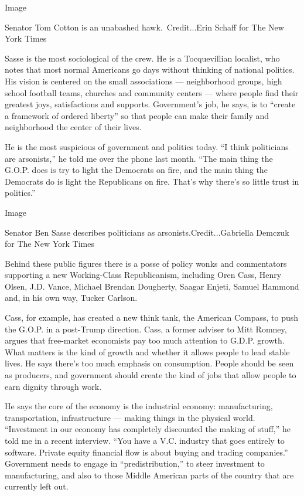 Image

Senator Tom Cotton is an unabashed hawk.~Credit...Erin Schaff for The
New York Times

Sasse is the most sociological of the crew. He is a Tocquevillian
localist, who notes that most normal Americans go days without thinking
of national politics. His vision is centered on the small associations
--- neighborhood groups, high school football teams, churches and
community centers --- where people find their greatest joys,
satisfactions and supports. Government's job, he says, is to ``create a
framework of ordered liberty'' so that people can make their family and
neighborhood the center of their lives.

He is the most suspicious of government and politics today. ``I think
politicians are arsonists,'' he told me over the phone last month. ``The
main thing the G.O.P. does is try to light the Democrats on fire, and
the main thing the Democrats do is light the Republicans on fire. That's
why there's so little trust in politics.''

Image

Senator Ben Sasse describes politicians as arsonists.Credit...Gabriella
Demczuk for The New York Times

Behind these public figures there is a posse of policy wonks and
commentators supporting a new Working-Class Republicanism, including
Oren Cass, Henry Olsen, J.D. Vance, Michael Brendan Dougherty, Saagar
Enjeti, Samuel Hammond and, in his own way, Tucker Carlson.

Cass, for example, has created a new think tank, the American Compass,
to push the G.O.P. in a post-Trump direction. Cass, a former adviser to
Mitt Romney, argues that free-market economists pay too much attention
to G.D.P. growth. What matters is the kind of growth and whether it
allows people to lead stable lives. He says there's too much emphasis on
consumption. People should be seen as producers, and government should
create the kind of jobs that allow people to earn dignity through work.

He says the core of the economy is the industrial economy:
manufacturing, transportation, infrastructure --- making things in the
physical world. ``Investment in our economy has completely discounted
the making of stuff,'' he told me in a recent interview. ``You have a
V.C. industry that goes entirely to software. Private equity financial
flow is about buying and trading companies.'' Government needs to engage
in ``predistribution,'' to steer investment to manufacturing, and also
to those Middle American parts of the country that are currently left
out.

